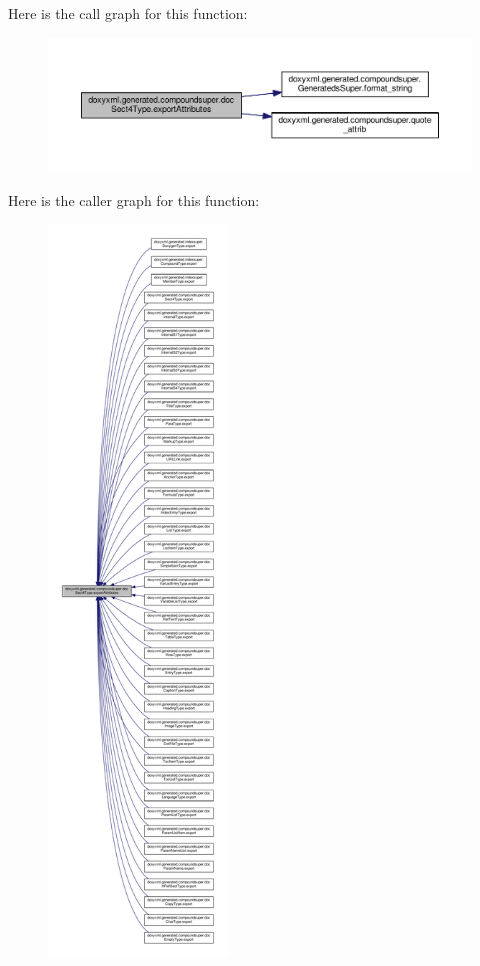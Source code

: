 Here is the call graph for this function\+:
\nopagebreak
\begin{figure}[H]
\begin{center}
\leavevmode
\includegraphics[width=350pt]{d7/d97/classdoxyxml_1_1generated_1_1compoundsuper_1_1docSect4Type_a2a1e4805897104500ba6fcf0c22e0398_cgraph}
\end{center}
\end{figure}




Here is the caller graph for this function\+:
\nopagebreak
\begin{figure}[H]
\begin{center}
\leavevmode
\includegraphics[height=550pt]{d7/d97/classdoxyxml_1_1generated_1_1compoundsuper_1_1docSect4Type_a2a1e4805897104500ba6fcf0c22e0398_icgraph}
\end{center}
\end{figure}


